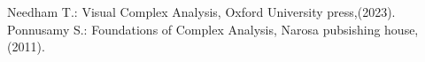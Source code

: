 \documentclass[11pt]{extarticle}
\begin{document}
\begin{multicols}{2}
\begin{easylist}
	
	
	\begin{thebibliography}{9}
		Needham T.: Visual Complex Analysis, Oxford University press,(2023).
		Ponnusamy S.: Foundations of Complex Analysis, Narosa pubsishing house,(2011).
	\end{thebibliography}
\end{easylist}
\end{multicols}
\end{document}
